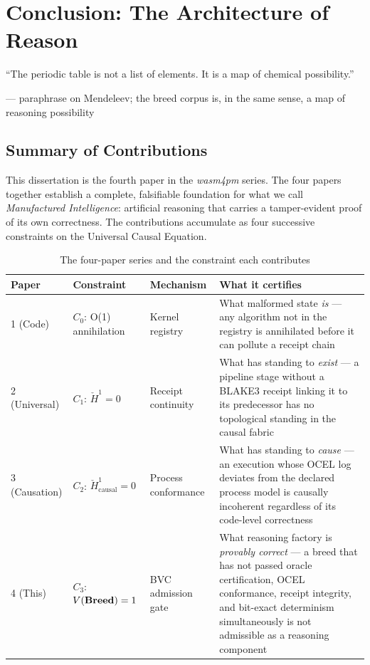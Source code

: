 
\chapter{Conclusion: The Architecture of Reason}
\label{chap:conclusion}
\label{chap:synthesis}

\epigraph{%
  ``The periodic table is not a list of elements. It is a map of chemical
  possibility.''
}{--- paraphrase on Mendeleev; the breed corpus is, in the same sense,
  a map of reasoning possibility}

\section{Summary of Contributions}
\label{sec:summary}

This dissertation is the fourth paper in the \emph{wasm4pm} series. The four papers together
establish a complete, falsifiable foundation for what we call \emph{Manufactured Intelligence}:
artificial reasoning that carries a tamper-evident proof of its own correctness. The
contributions accumulate as four successive constraints on the Universal Causal Equation.

\begin{table}[h]
\centering
\caption{The four-paper series and the constraint each contributes}
\label{tab:four-paper-series}
\begin{tabular}{lllp{6cm}}
\toprule
\textbf{Paper} & \textbf{Constraint} & \textbf{Mechanism} & \textbf{What it certifies} \\
\midrule
1 (Code)      & $C_0$: O(1) annihilation
              & Kernel registry
              & What malformed state \emph{is} — any algorithm not in the registry
                is annihilated before it can pollute a receipt chain \\[4pt]
2 (Universal) & $C_1$: $\check{H}^1 = 0$
              & Receipt continuity
              & What has standing to \emph{exist} — a pipeline stage without a
                BLAKE3 receipt linking it to its predecessor has no topological
                standing in the causal fabric \\[4pt]
3 (Causation) & $C_2$: $\check{H}^1_{\mathrm{causal}} = 0$
              & Process conformance
              & What has standing to \emph{cause} — an execution whose OCEL log
                deviates from the declared process model is causally incoherent
                regardless of its code-level correctness \\[4pt]
4 (This)      & $C_3$: $V(\mathbf{Breed}) = 1$
              & BVC admission gate
              & What reasoning factory is \emph{provably correct} — a breed that
                has not passed oracle certification, OCEL conformance, receipt
                integrity, and bit-exact determinism simultaneously is not
                admissible as a reasoning component \\
\bottomrule
\end{tabular}
\end{table}

